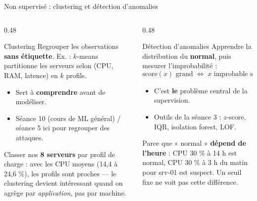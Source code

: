 \begin{frame}{Non supervisé : clustering et détection d'anomalies}
\footnotesize%
\begin{columns}[t]
\begin{column}{0.48\textwidth}
\begin{block}{Clustering}
Regrouper les observations \textbf{sans étiquette}. Ex. : $k$-means
partitionne les serveurs selon (CPU, RAM, latence) en $k$ profils.
\begin{itemize}
\item Sert à \textbf{comprendre} avant de modéliser.
\item Séance 10 (cours de ML général) / séance 5 ici pour regrouper des attaques.
\end{itemize}
\end{block}
\begin{ebox}
Classer nos \textbf{8 serveurs} par profil de charge : avec les CPU moyens
(14,4 à 24,6 \%), les profils sont proches --- le clustering devient intéressant
quand on agrège par \emph{application}, pas par machine.
\end{ebox}
\end{column}
\begin{column}{0.48\textwidth}
\begin{block}{Détection d'anomalies}
Apprendre la distribution du \textbf{normal}, puis mesurer l'improbabilité :
\[
\text{score}(x) \text{ grand}
\;\Longleftrightarrow\;
x \text{ improbable sous } p_{\text{norm}}
\]
\begin{itemize}
\item C'est \textbf{le} problème central de la supervision.
\item Outils de la séance 3 : $z$-score, IQR, isolation forest, LOF.
\end{itemize}
\end{block}
\begin{kbox}
Parce que « normal » \textbf{dépend de l'heure} : CPU 30 \% à 14 h est normal,
CPU 30 \% à 3 h du matin pour srv-01 est suspect. Un seuil fixe ne voit pas cette différence.
\end{kbox}
\end{column}
\end{columns}
\end{frame}

